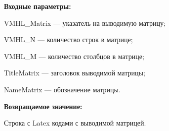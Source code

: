 \textbf{Входные параметры:}

VMHL\_Matrix --- указатель на выводимую матрицу;
 
VMHL\_N --- количество строк в матрице;
 
VMHL\_M --- количество столбцов в матрице;
 
TitleMatrix --- заголовок выводимой матрицы;
 
NameMatrix --- обозначение матрицы.
	
\textbf{Возвращаемое значение:}

Строка с Latex кодами с выводимой матрицей.